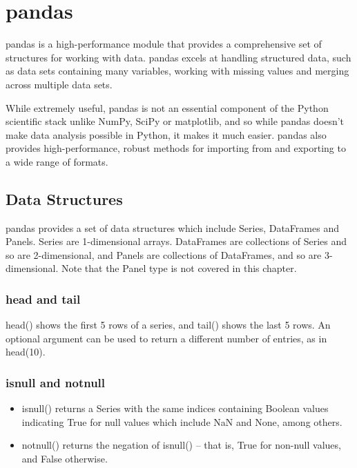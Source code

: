 \documentclass[KSmain.tex]{subfiles}
\begin{document}
 

\section{pandas}
pandas is a high-performance module that provides a comprehensive set of structures for working with
data. pandas excels at handling structured data, such as data sets containing many variables, working with
missing values and merging across multiple data sets. 

While extremely useful, pandas is not an essential component of the Python scientific stack unlike NumPy, SciPy or matplotlib, and so while pandas doesn’t
make data analysis possible in Python, it makes it much easier. pandas also provides high-performance,
robust methods for importing from and exporting to a wide range of formats.
\subsection{Data Structures}
pandas provides a set of data structures which include Series, DataFrames and Panels. Series are 1-dimensional
arrays. DataFrames are collections of Series and so are 2-dimensional, and Panels are collections of DataFrames,
and so are 3-dimensional. Note that the Panel type is not covered in this chapter.

\subsubsection*{head and tail}
head() shows the first 5 rows of a series, and tail() shows the last 5 rows. An optional argument can be
used to return a different number of entries, as in head(10).
\subsubsection*{isnull and notnull}

\begin{itemize}
\item isnull() returns a Series with the same indices containing Boolean values indicating True for null values
which include NaN and None, among others. 

\item notnull() returns the negation of isnull() – that is, True for
non-null values, and False otherwise.
\end{itemize}
\end{document}
